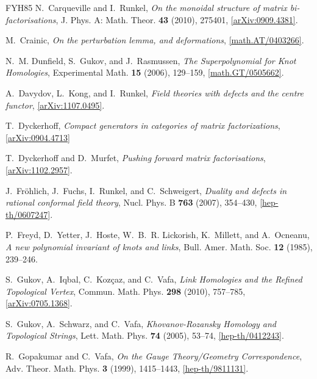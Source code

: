 \documentclass{compositio}
\theoremstyle{definition}
\numberwithin{equation}{section}
\begin{document}
\begin{thebibliography}{FYH{\etalchar{+}}85}
N.~Carqueville and I.~Runkel, \emph{On the monoidal structure of matrix bi-factorisations}, J. Phys.
  A: Math. Theor. \textbf{43} (2010), 275401,
  \href{http://arxiv.org/abs/0909.4381}{[arXiv:0909.4381]}.

M.~Crainic, \emph{On the perturbation lemma, and deformations},
  \href{http://arxiv.org/abs/math/0403266}{[math.AT/0403266]}.

N.~M. Dunfield, S.~Gukov, and J.~Rasmussen, \emph{The {S}uperpolynomial for
  {K}not {H}omologies}, Experimental Math. \textbf{15} (2006), 129--159,
  \href{http://arxiv.org/abs/math/0505662}{[math.GT/0505662]}.

A.~Davydov, L.~Kong, and I.~Runkel, \emph{Field theories with defects and the
  centre functor}, \href{http://arxiv.org/abs/1107.0495}{[arXiv:1107.0495]}.
  
T.~Dyckerhoff, \emph{Compact generators in categories of matrix factorizations},
  \href{http://arxiv.org/abs/0904.4713}{[arXiv:0904.4713]}

T.~Dyckerhoff and D.~Murfet, \emph{Pushing forward matrix factorisations},
  \href{http://arxiv.org/abs/1102.2957}{[arXiv:1102.2957]}.

J.~Fr\"ohlich, J.~Fuchs, I.~Runkel, and C.~Schweigert, \emph{Duality and
  defects in rational conformal field theory}, Nucl. Phys. B \textbf{763}
  (2007), 354--430,
  \href{http://arxiv.org/abs/hep-th/0607247}{[hep-th/0607247]}.

P.~Freyd, D.~Yetter, J.~Hoste, W.~B.~R. Lickorish, K.~Millett, and A.~Ocneanu,
  \emph{A new polynomial invariant of knots and links}, Bull. Amer. Math. Soc.
  \textbf{12} (1985), 239--246.

S.~Gukov, A.~Iqbal, C.~Koz\c{c}az, and C.~Vafa, \emph{Link {H}omologies and the
  {R}efined {T}opological {V}ertex}, Commun. Math. Phys. \textbf{298} (2010),
  757--785, \href{http://arxiv.org/abs/0705.1368}{[arXiv:0705.1368]}.

S.~Gukov, A.~Schwarz, and C.~Vafa, \emph{Khovanov-{R}ozansky {H}omology and
  {T}opological {S}trings}, Lett. Math. Phys. \textbf{74} (2005), 53--74,
  \href{http://arxiv.org/abs/hep-th/0412243}{[hep-th/0412243]}.

R.~Gopakumar and C.~Vafa, \emph{On the {G}auge {T}heory/{G}eometry
  {C}orrespondence}, Adv. Theor. Math. Phys. \textbf{3} (1999), 1415--1443,
  \href{http://arxiv.org/abs/hep-th/9811131}{[hep-th/9811131]}.


\end{thebibliography}
\end{document}
